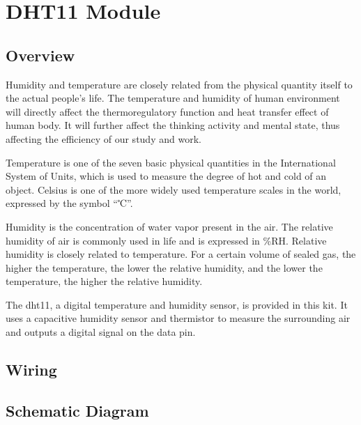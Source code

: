 \documentclass[a4paper,11pt,english]{sphinxmanual}
\begin{document}
\sphinxstepscope


\section{DHT11 Module}
\label{\detokenize{Basic_Project/DHT11_Module:dht11-module}}\label{\detokenize{Basic_Project/DHT11_Module:basic-dht11-module}}\label{\detokenize{Basic_Project/DHT11_Module::doc}}

\subsection{Overview}
\label{\detokenize{Basic_Project/DHT11_Module:overview}}
\sphinxAtStartPar
Humidity and temperature are closely related from the physical quantity itself to the actual people’s life.
The temperature and humidity of human environment will directly affect the thermoregulatory function and heat transfer effect of human body.
It will further affect the thinking activity and mental state, thus affecting the efficiency of our study and work.

\sphinxAtStartPar
Temperature is one of the seven basic physical quantities in the International System of Units, which is used to measure the degree of hot and cold of an object.
Celsius is one of the more widely used temperature scales in the world, expressed by the symbol “℃”.

\sphinxAtStartPar
Humidity is the concentration of water vapor present in the air.
The relative humidity of air is commonly used in life and is expressed in \%RH. Relative humidity is closely related to temperature.
For a certain volume of sealed gas, the higher the temperature, the lower the relative humidity, and the lower the temperature, the higher the relative humidity.

\sphinxAtStartPar
The dht11, a digital temperature and humidity sensor, is provided in this kit. It uses a capacitive humidity sensor and thermistor to measure the surrounding air and outputs a digital signal on the data pin.


\subsection{Wiring}
\label{\detokenize{Basic_Project/DHT11_Module:wiring}}


\subsection{Schematic Diagram}
\label{\detokenize{Basic_Project/DHT11_Module:schematic-diagram}}
\end{document}

